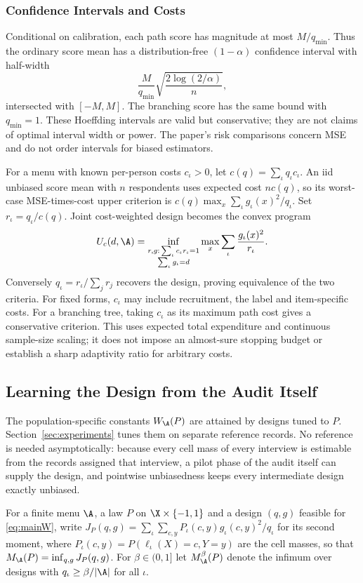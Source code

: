 \subsubsection{Confidence Intervals and Costs}
Conditional on calibration, each path score has magnitude at most $M/q_{\min}$. Thus the ordinary score mean has a distribution-free $(1-\alpha)$ confidence interval with half-width
\[
 \frac{M}{q_{\min}}\sqrt{\frac{2\log(2/\alpha)}n},
\]
intersected with $[-M,M]$. The branching score has the same bound with $q_{\min}=1$. These Hoeffding intervals are valid but conservative; they are not claims of optimal interval width or power. The paper's risk comparisons concern MSE and do not order intervals for biased estimators.

For a menu with known per-person costs $c_\iota>0$, let $c(q)=\sum_\iota q_\iota c_\iota$. An iid unbiased score mean with $n$ respondents uses expected cost $nc(q)$, so its worst-case MSE-times-cost upper criterion is $c(q)\max_x\sum_\iota g_\iota(x)^2/q_\iota$. Set $r_\iota=q_\iota/c(q)$. Joint cost-weighted design becomes the convex program
\[
 U_c(d,\A)=\inf_{\substack{r,g:\,\sum_\iota c_\iota r_\iota=1\\ \sum_\iota g_\iota=d}}
              \max_x\sum_\iota\frac{g_\iota(x)^2}{r_\iota}.
\]
Conversely $q_\iota=r_\iota/\sum_jr_j$ recovers the design, proving equivalence of the two criteria. For fixed forms, $c_\iota$ may include recruitment, the label and item-specific costs. For a branching tree, taking $c_\iota$ as its maximum path cost gives a conservative criterion. This uses expected total expenditure and continuous sample-size scaling; it does not impose an almost-sure stopping budget or establish a sharp adaptivity ratio for arbitrary costs.

\subsection{Learning the Design from the Audit Itself}\label{app:selfcal}
The population-specific constants $W_\A(P)$ are attained by designs tuned to
$P$. Section~\ref{sec:experiments} tunes them on separate reference records.
No reference is needed asymptotically: because every cell mass of every
interview is estimable from the records assigned that interview, a pilot
phase of the audit itself can supply the design, and pointwise unbiasedness
keeps every intermediate design exactly unbiased.

For a finite menu $\A$, a law $P$ on $\X\times\{-1,1\}$ and a design $(q,g)$
feasible for \eqref{eq:mainW}, write $J_P(q,g)=\sum_\iota\sum_{c,y}P_\iota(c,y)g_\iota(c,y)^2/q_\iota$
for its second moment, where $P_\iota(c,y)=P(\ell_\iota(X)=c,Y=y)$ are the
cell masses, so that $M_\A(P)=\inf_{q,g}J_P(q,g)$. For $\beta\in(0,1]$ let
$M_\A^{\beta}(P)$ denote the infimum over designs with $q_\iota\ge\beta/|\A|$
for all $\iota$.

